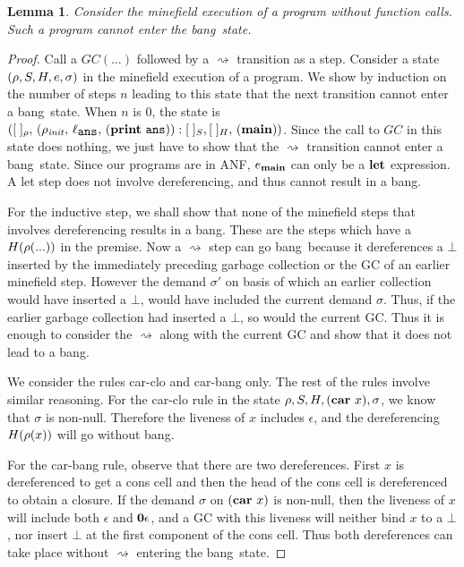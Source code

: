 \documentclass[9pt]{sigplanconf}
\newcommand{\bang}{\mbox{\sc bang}}
\newtheorem{lemma}[theorem]{Lemma}
\begin{document}
\begin{lemma}
\label{lemma:call-less-cannot-go-bang}
Consider the minefield execution of  a program without function calls.
Such a program cannot enter the \bang\ state.
\end{lemma}
\begin{proof}
Call a $GC(\ldots)$  followed by a $\rightsquigarrow$  transition as a
step. Consider a state $(\rho, S,  H, e, \sigma)$ in the minefield
execution of a  program.  We show by induction on  the number of steps
$n$ leading  to this  state that  the next  transition cannot  enter a
\bang\ state.  When $n$ is 0,  the state is $([\;]_\rho,\,    (\rho_\mathit{init},   \, \ell_{\mathbf{\mbox{\tt ans}}}  ,\,
(\mathbf{print}~\mathbf{\mbox{\tt ans}})):[\;]_{S}, 
[\;]_{H},\, (\mathbf{main}))$.   Since  the
            call to $GC$  in this state does  nothing, we just
            have to show that the $\rightsquigarrow$ transition cannot
            enter  a \bang\  state.  Since  our programs  are in  ANF,
            $e_{\mathbf{main}}$ can  only be  a $\mbox{$\mathbf{ let}$}$ expression.   A {\sc
              let}  step  does  not involve  dereferencing,  and  thus
            cannot result in a \bang.

For the inductive step, we shall show that none of the minefield steps
that involves dereferencing  results in a \bang.  These  are the steps
which   have   a   $H(\rho(...))$   in   the   premise.    Now   a
$\rightsquigarrow$ step can go \bang\ because it dereferences a $\bot$
inserted  by  the  immediately  preceding garbage  collection  or  the
GC of an earlier minefield step.  However the
  demand $\sigma'$ on basis of  which an earlier collection would have
  inserted a $\bot$, would have  included the current demand $\sigma$.
  Thus, if  the earlier garbage  collection had inserted a  $\bot$, so
  would the current GC.  Thus it is enough to consider
  the $\rightsquigarrow$  along with the  current GC and show  that it
  does not lead to a \bang.

We consider the rules {\sc car-clo} and {\sc car-bang} only.  
The rest  of the rules involve similar reasoning. For the {\sc
  car-clo}  rule in  the state  $\rho, S,  H, (\mbox{$\mathbf{car}$}~x),
\sigma$, we  know that $\sigma$ is  non-null. Therefore
the  liveness  of  $x$  includes  $\epsilon$,  and  the
dereferencing $H(\rho(x))$ will go without \bang.

For the  {\sc car-bang}  rule, observe that  there are
two dereferences.  First $x$  is dereferenced to  get a
cons  cell  and then  the  head  of  the cons  cell  is
dereferenced  to  obtain  a  closure.   If  the  demand
$\sigma$ on  $(\mbox{$\mathbf{car}$}~x)$ is non-null, then  the liveness
of    $x$   will    include    both   $\epsilon$    and
$\mathbf{0}\epsilon$,  and  a  GC with  this  liveness  will
neither bind $x$ to a  $\bot$, nor insert $\bot$ at the
first   component  of   the   cons   cell.  Thus   both
dereferences    can take place without 
$\rightsquigarrow$ entering the   \bang\ state.
\end{proof} 
\end{document}
